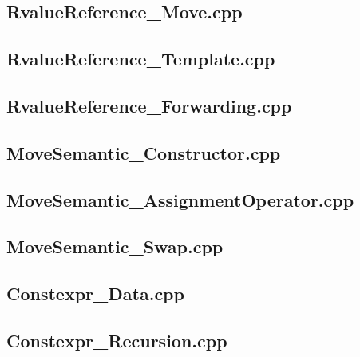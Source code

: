 \documentclass[11pt]{report}
\begin{document}
\begin{appendix}
\subsection{RvalueReference\_Move.cpp}
\label{RvalueReference_Move}


\subsection{RvalueReference\_Template.cpp}
\label{RvalueReference_Template}


\subsection{RvalueReference\_Forwarding.cpp}
\label{RvalueReference_Forwarding}


\subsection{MoveSemantic\_Constructor.cpp}
\label{MoveSemantic_Constructor}


\subsection{MoveSemantic\_AssignmentOperator.cpp}
\label{MoveSemantic_AssignmentOperator}


\subsection{MoveSemantic\_Swap.cpp}
\label{MoveSemantic_Swap}


\subsection{Constexpr\_Data.cpp}
\label{Constexpr_Data}


\subsection{Constexpr\_Recursion.cpp}
\label{Constexpr_Recursion}



\end{appendix}
\end{document}
